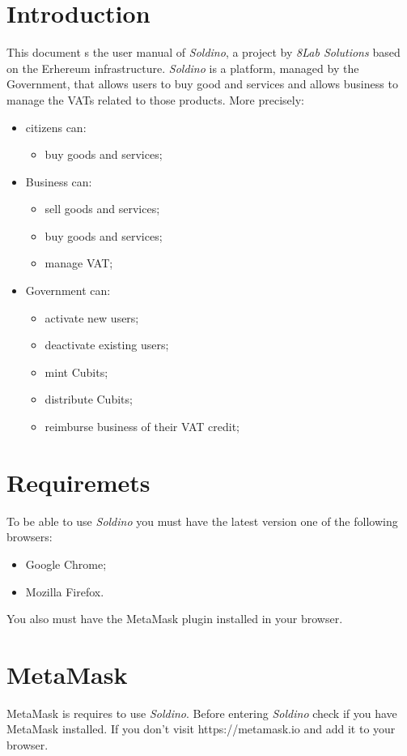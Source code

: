 \section{Introduction} 
	This document s the user manual of \textit{Soldino}, a project by 
	\textit{8Lab Solutions} based on the Erhereum infrastructure. 
	\textit{Soldino} is a platform, managed by the Government, that allows 
	users to buy good and services and allows business to manage the VATs 
	related to those products.
	More precisely:
	\begin{itemize}
		\item citizens can:
		\begin{itemize}
			\item  buy goods and services;
		\end{itemize}
		\item Business can:
		\begin{itemize}
			\item sell goods and services;
			\item buy goods and services;
			\item manage VAT;
		\end{itemize}
		\item Government can:
		\begin{itemize}
			\item activate new users;
			\item deactivate existing users;
			\item mint Cubits;
			\item distribute Cubits;
			\item reimburse business of their VAT credit;
		\end{itemize}
	\end{itemize}

\section{Requiremets}
	To be able to use \textit{Soldino} you must have the latest version one 
	of the following browsers:
	\begin{itemize}
		\item Google Chrome;
		\item Mozilla Firefox.
	\end{itemize}
	You also must have the MetaMask plugin installed in your browser.
\section{MetaMask}
MetaMask is requires to use \textit{Soldino}. Before entering \textit{Soldino} 
check if you have MetaMask installed. If you don't visit https://metamask.io 
and add it to your browser.
	

